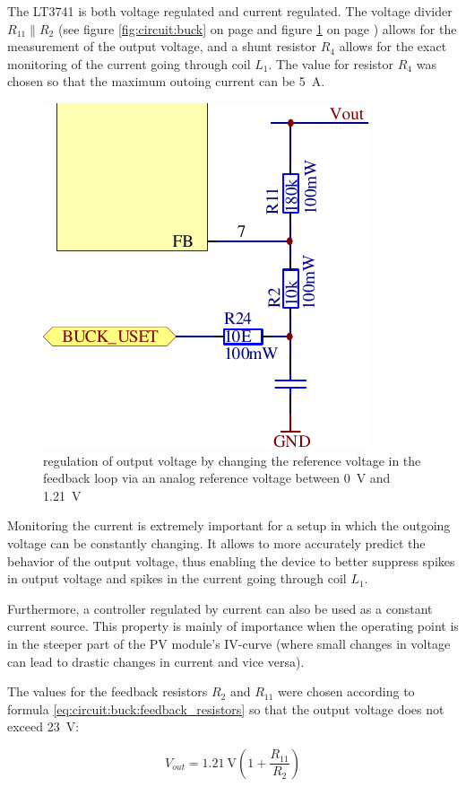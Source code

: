 The  LT3741  is both  voltage  regulated  and current  regulated. The  voltage
divider  $R_{11} \parallel  R_2$  (see figure  \ref{fig:circuit:buck} on  page
\pageref{fig:circuit:buck}  and  figure  \ref{fig:circuit:buck:uset}  on  page
\pageref{fig:circuit:buck:uset})  allows for  the  measurement  of the  output
voltage, and  a shunt resistor  $R_4$ allows for  the exact monitoring  of the
current going through  coil $L_1$. The value for resistor $R_4$  was chosen so
that the maximum outoing current can be \SI{5}{\ampere}.

\begin{figure}[th!]
    \center
    \includegraphics[width=.35\textwidth]{images/circuit/buck-uset.pdf}
    \caption{regulation of output voltage by changing the reference voltage in the feedback loop via an analog reference voltage between \SI{0}{\volt} and \SI{1.21}{\volt}}
    \label{fig:circuit:buck:uset}
\end{figure}

Monitoring  the current  is  extremely  important for  a  setup  in which  the
outgoing  voltage can  be constantly  changing. It allows  to more  accurately
predict the behavior of the output voltage, thus enabling the device to better
suppress spikes in output voltage and spikes in the current going through coil
$L_1$. %

Furthermore, a controller regulated by current  can also be used as a constant
current source. This property is mainly of importance when the operating point
is in  the steeper part  of the PV module's  IV-curve (where small  changes in
voltage can lead to drastic changes in current and vice versa).

The values for the feedback resistors $R_2$ and $R_{11}$ were chosen according
to formula \ref{eq:circuit:buck:feedback_resistors} so that the output voltage
does not exceed \SI{23}{\volt}:

\begin{equation}
    V_{out} = \SI{1.21}{\volt} \left( 1 + \frac{R_{11}}{R_2} \right)
    \label{eq:circuit:buck:feedback_resistors}
\end{equation}

